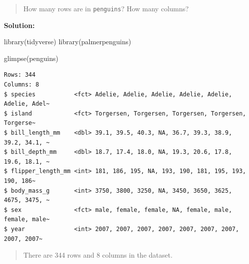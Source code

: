 \documentclass[
  letterpaper,
  DIV=11,
  numbers=noendperiod]{scrreprt}
\newenvironment{Shaded}{\begin{snugshade}}{\end{snugshade}}
\newcommand{\FunctionTok}[1]{\textcolor[rgb]{0.28,0.35,0.67}{#1}}
\newcommand{\NormalTok}[1]{\textcolor[rgb]{0.00,0.23,0.31}{#1}}
\begin{document}
\begin{quote}
How many rows are in \texttt{penguins}? How many columns?
\end{quote}

\textbf{Solution:}

\begin{Shaded}
\begin{Highlighting}[]
\FunctionTok{library}\NormalTok{(tidyverse)}
\FunctionTok{library}\NormalTok{(palmerpenguins)}

\FunctionTok{glimpse}\NormalTok{(penguins)}
\end{Highlighting}
\end{Shaded}

\begin{verbatim}
Rows: 344
Columns: 8
$ species           <fct> Adelie, Adelie, Adelie, Adelie, Adelie, Adelie, Adel~
$ island            <fct> Torgersen, Torgersen, Torgersen, Torgersen, Torgerse~
$ bill_length_mm    <dbl> 39.1, 39.5, 40.3, NA, 36.7, 39.3, 38.9, 39.2, 34.1, ~
$ bill_depth_mm     <dbl> 18.7, 17.4, 18.0, NA, 19.3, 20.6, 17.8, 19.6, 18.1, ~
$ flipper_length_mm <int> 181, 186, 195, NA, 193, 190, 181, 195, 193, 190, 186~
$ body_mass_g       <int> 3750, 3800, 3250, NA, 3450, 3650, 3625, 4675, 3475, ~
$ sex               <fct> male, female, female, NA, female, male, female, male~
$ year              <int> 2007, 2007, 2007, 2007, 2007, 2007, 2007, 2007, 2007~
\end{verbatim}

\begin{quote}
There are 344 rows and 8 columns in the dataset.
\end{quote}
\end{document}
